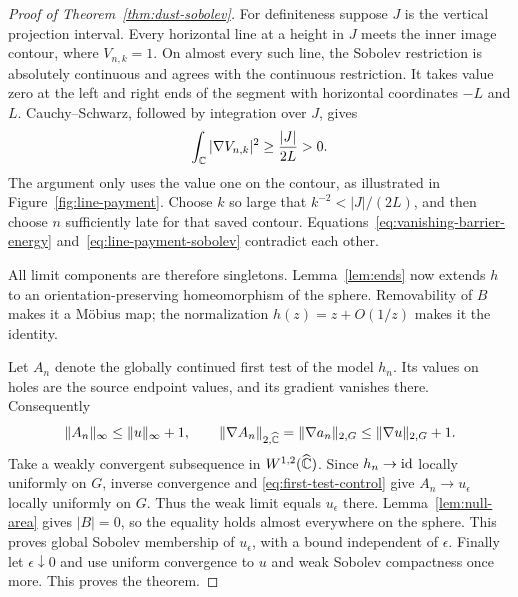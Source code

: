\begin{proof}[Proof of Theorem~\ref{thm:dust-sobolev}]


For definiteness suppose $J$ is the vertical projection interval.
Every horizontal line at a height in $J$ meets the inner image contour, where
$V_{n,k}=1$.  On almost every such line, the Sobolev restriction is
absolutely continuous and agrees with the continuous restriction.
It takes value zero at the left and right ends of the segment with
horizontal coordinates $-L$ and $L$.  Cauchy--Schwarz, followed by
integration over $J$, gives
\begin{equation}\label{eq:line-payment-sobolev}
 \int_\mathbb C|\nabla V_{n,k}|^2
 \ge\frac{|J|}{2L}>0.
\end{equation}
The argument only uses the value one on the contour, as illustrated
in Figure~\ref{fig:line-payment}.  Choose $k$ so large that
$k^{-2}<|J|/(2L)$, and then choose $n$ sufficiently late for that
saved contour.  Equations~\eqref{eq:vanishing-barrier-energy}
and~\eqref{eq:line-payment-sobolev} contradict each other.

All limit components are therefore singletons.
Lemma~\ref{lem:ends} now extends $h$ to an orientation-preserving
homeomorphism of the sphere.  Removability of $B$ makes it a M\"obius
map; the normalization $h(z)=z+O(1/z)$ makes it the identity.

Let $A_n$ denote the globally continued first test of the model $h_n$.
Its values on holes are the source endpoint values, and its gradient
vanishes there.  Consequently
\[
 \|A_n\|_\infty\le\|u\|_\infty+1,\qquad
 \|\nabla A_n\|_{2,\widehat{\mathbb C}}
   =\|\nabla a_n\|_{2,G}\le\|\nabla u\|_{2,G}+1.
\]
Take a weakly convergent subsequence in $W^{1,2}(\widehat{\mathbb C})$.  Since
$h_n\to\mathrm{id}$ locally uniformly on $G$, inverse convergence and
\eqref{eq:first-test-control} give $A_n\to u_\epsilon$ locally
uniformly on $G$.  Thus the weak limit equals $u_\epsilon$ there.
Lemma~\ref{lem:null-area} gives $|B|=0$, so the equality holds almost
everywhere on the sphere.  This proves global Sobolev membership of
$u_\epsilon$, with a bound independent of $\epsilon$.  Finally let
$\epsilon\downarrow0$ and use uniform convergence to $u$ and weak
Sobolev compactness once more.  This proves the theorem.
\end{proof}
